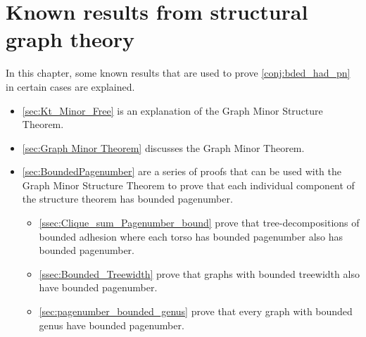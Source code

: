 
\chapter{Known results from structural graph theory}\label{chap:Known results}
In this chapter, some known results that are used to prove \cref{conj:bded_had_pn} in certain cases are explained.

\begin{itemize}
	\item \cref{sec:Kt_Minor_Free} is an explanation of the Graph Minor Structure Theorem.
	\item \cref{sec:Graph Minor Theorem} discusses the Graph Minor Theorem. 
	\item \cref{sec:BoundedPagenumber} are a series of proofs that can be used with the Graph Minor Structure Theorem to prove that each individual component of the structure theorem has bounded pagenumber.
	\begin{itemize}
		\item \cref{ssec:Clique_sum_Pagenumber_bound} prove that tree-decompositions of bounded adhesion where each torso has bounded pagenumber also has bounded pagenumber.
		\item \cref{ssec:Bounded_Treewidth} prove that graphs with bounded treewidth also have bounded pagenumber.
		\item \cref{sec:pagenumber_bounded_genus} prove that every graph with bounded genus have bounded pagenumber.
	\end{itemize}
\end{itemize}




